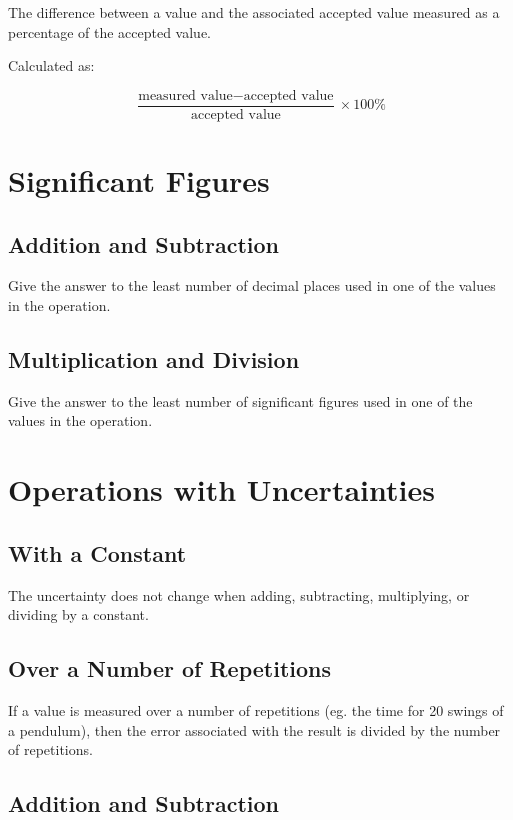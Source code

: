 \documentclass[a4paper,11pt]{article}
\begin{document}
The difference between a value and the associated accepted value measured as a
percentage of the accepted value.

Calculated as:

$$
\frac{\text{measured value} - \text{accepted value}}{\text{accepted value}} \times 100\%
$$




\section{Significant Figures}

\subsection{Addition and Subtraction}

Give the answer to the least number of decimal places used in one of the values
in the operation.


\subsection{Multiplication and Division}

Give the answer to the least number of significant figures used in one of the
values in the operation.




\section{Operations with Uncertainties}

\subsection{With a Constant}

The uncertainty does not change when adding, subtracting, multiplying, or
dividing by a constant.


\subsection{Over a Number of Repetitions}

If a value is measured over a number of repetitions (eg. the time for 20 swings
of a pendulum), then the error associated with the result is divided by the
number of repetitions.


\subsection{Addition and Subtraction}
\end{document}

